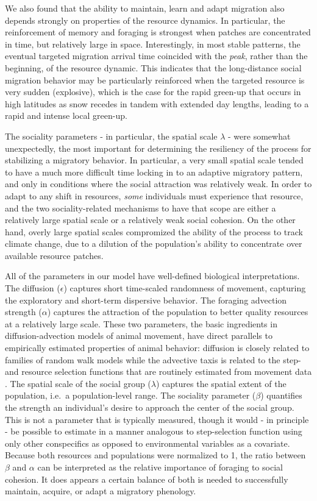 \documentclass[12pt]{article}
\begin{document}
We also found that the ability to maintain, learn and adapt migration also depends strongly on properties of the resource dynamics. In particular, the reinforcement of memory and foraging is strongest when patches are concentrated in time, but relatively large in space. Interestingly, in most stable patterns, the eventual targeted migration arrival time coincided with the \emph{peak}, rather than the beginning, of the resource dynamic. This indicates that the long-distance social migration behavior may be particularly reinforced when the targeted resource is very sudden (explosive), which is the case for the rapid green-up that occurs in high latitudes as snow recedes in tandem with extended day lengths, leading to a rapid and intense local green-up.

The sociality parameters - in particular, the spatial scale $\lambda$ - were somewhat unexpectedly, the most important for determining the resiliency of the process for stabilizing a migratory behavior. In particular, a very small spatial scale tended to have a much more difficult time locking in to an adaptive migratory pattern, and only in conditions where the social attraction was relatively weak. In order to adapt to any shift in resources, \emph{some} individuals must experience that resource, and the two sociality-related mechanisms to have that scope are either a relatively large spatial scale or a relatively weak social cohesion. On the other hand, overly large spatial scales compromized the ability of the process to track climate change, due to a dilution of the population's ability to concentrate over available resource patches.

All of the parameters in our model have well-defined biological interpretations. The diffusion ($\epsilon$) captures short time-scaled randomness of movement, capturing the exploratory and short-term dispersive behavior. The foraging advection strength ($\alpha$) captures the attraction of the population to better quality resources at a relatively large scale. These two parameters, the basic ingredients in diffusion-advection models of animal movement, have direct parallels to empirically estimated properties of animal behavior: diffusion is closely related to families of random walk models \citep{Gurarie2011} while the advective taxis is related to the step- and resource selection functions that are routinely estimated from movement data \citep{Potts2020}. The spatial scale of the social group ($\lambda$) captures the spatial extent of the population, i.e.~a population-level range. The sociality parameter ($\beta$) quantifies the strength an individual's desire to approach the center of the social group. This is not a parameter that is typically measured, though it would - in principle - be possible to estimate in a manner analogous to step-selection function using only other conspecifics as opposed to environmental variables as a covariate. Because both resources and populations were normalized to 1, the ratio between $\beta$ and $\alpha$ can be interpreted as the relative importance of foraging to social cohesion. It does appears a certain balance of both is needed to successfully maintain, acquire, or adapt a migratory phenology. 
\end{document}
